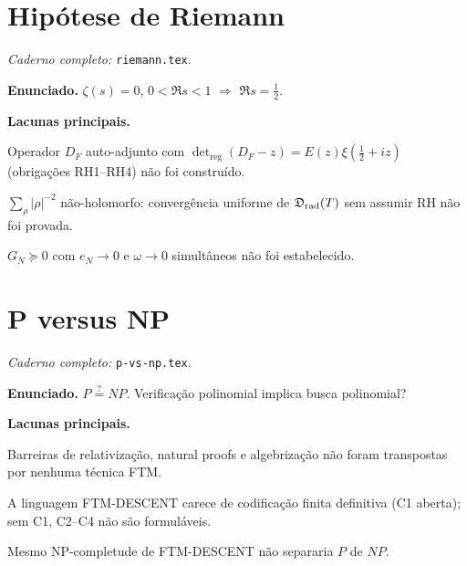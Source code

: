 \documentclass[11pt,a4paper]{article}
\begin{document}
\section{Hipótese de Riemann}

\textit{Caderno completo:} \texttt{riemann.tex}.

\medskip
\noindent\textbf{Enunciado.}
$\zeta(s)=0$, $0<\Re s<1$ $\Rightarrow$ $\Re s=\tfrac12$.

\medskip
\noindent\textbf{Lacunas principais.}
\begin{gap}
  Operador $D_F$ auto-adjunto com $\det_{\mathrm{reg}}(D_F-z)=E(z)\xi(\tfrac12+iz)$
  (obrigações RH1–RH4) não foi construído. \OPEN
\end{gap}
\begin{gap}
  $\sum_\rho|\rho|^{-2}$ não-holomorfo: convergência uniforme de $\mathfrak{D}_{\mathrm{rad}}(T)$
  sem assumir RH não foi provada. \OPEN
\end{gap}
\begin{gap}
  $G_N\succeq0$ com $e_N\to0$ e $\omega\to0$ simultâneos não foi estabelecido. \OPEN
\end{gap}


\clearpage

\section{P versus NP}

\textit{Caderno completo:} \texttt{p-vs-np.tex}.

\medskip
\noindent\textbf{Enunciado.}
$P\stackrel{?}{=}NP$. Verificação polinomial implica busca polinomial?

\medskip
\noindent\textbf{Lacunas principais.}
\begin{gap}
  Barreiras de relativização, natural proofs e algebrização não foram
  transpostas por nenhuma técnica FTM. \OPEN
\end{gap}
\begin{gap}
  A linguagem FTM-DESCENT carece de codificação finita definitiva (C1 aberta);
  sem C1, C2–C4 não são formuláveis. \OPEN
\end{gap}
\begin{gap}
  Mesmo NP-completude de FTM-DESCENT não separaria $P$ de $NP$. \OPEN
\end{gap}
\end{document}
